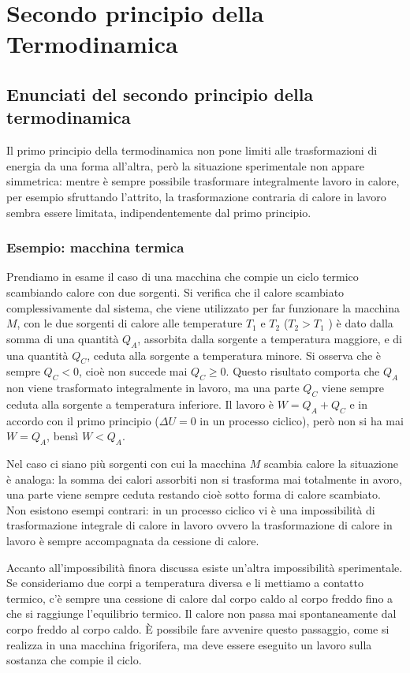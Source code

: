 \documentclass[class=book, crop=false, oneside, 12pt]{standalone}
\begin{document}
\chapter{Secondo principio della Termodinamica}

\section{Enunciati del secondo principio della termodinamica}

Il primo principio della termodinamica non pone limiti alle trasformazioni di energia da una forma all'altra, però la situazione sperimentale non appare simmetrica: mentre è sempre possibile trasformare integralmente lavoro in calore, per esempio sfruttando l'attrito, la trasformazione contraria di calore in lavoro sembra essere limitata, indipendentemente dal primo principio.

\subsection{Esempio: macchina termica}

Prendiamo in esame il caso di una macchina che compie un ciclo termico scambiando calore con due sorgenti. 
Si verifica che il calore scambiato complessivamente dal sistema, che viene utilizzato per far funzionare la macchina \(M\), con le due sorgenti di calore alle temperature \(T_1\) e \(T_2\) (\(T_2 > T_1\) ) è dato dalla somma di una quantità \(Q_A\), assorbita dalla sorgente a temperatura maggiore, e di una quantità \(Q_C\), ceduta alla sorgente a temperatura minore. 
Si osserva che è sempre \(Q_C<0\), cioè non succede mai \(Q_C \geq 0\). 
Questo risultato comporta che \(Q_A\) non viene trasformato integralmente in lavoro, ma una parte \(Q_C\) viene sempre ceduta alla sorgente a temperatura inferiore. 
Il lavoro è \(W = Q_A + Q_C\) e in accordo con il primo principio (\(\Delta U = 0\) in un processo ciclico), però non si ha mai \(W = Q_A\), bensì \(W < Q_A\). 

Nel caso ci siano più sorgenti con cui la macchina \(M\) scambia calore la situazione è analoga: la somma dei calori assorbiti non si trasforma mai totalmente in avoro, una parte viene sempre ceduta restando cioè sotto forma di calore scambiato. 
Non esistono esempi contrari: in un processo ciclico vi è una impossibilità di trasformazione integrale di calore in lavoro ovvero la trasformazione di calore in lavoro è sempre accompagnata da cessione di calore. 

Accanto all'impossibilità finora discussa esiste un'altra impossibilità sperimentale. 
Se consideriamo due corpi a temperatura diversa e li mettiamo a contatto termico, c'è sempre una cessione di calore dal corpo caldo al corpo freddo fino a che si raggiunge l'equilibrio termico. 
Il calore non passa mai spontaneamente dal corpo freddo al corpo caldo. 
È possibile fare avvenire questo passaggio, come si realizza in una macchina frigorifera, ma deve essere eseguito un lavoro sulla sostanza che compie il ciclo.
\end{document}
